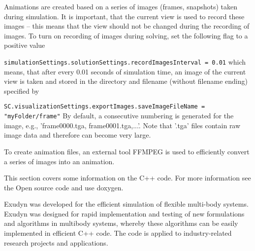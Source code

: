 Animations are created based on a series of images (frames, snapshots) taken during simulation. It is important, that the current view is used to record these images -- this means that the view should not be changed during the recording of images.
To turn on recording of images during solving, set the following flag to a positive value
\bi
  \item \texttt{simulationSettings.solutionSettings.recordImagesInterval = 0.01}
\ei
which means, that after every 0.01 seconds of simulation time, an image of the current view is taken and stored in the directory and filename (without filename ending) specified by 
\bi
  \item \texttt{SC.visualizationSettings.exportImages.saveImageFileName = "myFolder/frame"}
\ei
By default, a consecutive numbering is generated for the image, e.g., 'frame0000.tga, frame0001.tga,...'. Note that '.tga' files contain raw image data and therefore can become very large.

To create animation files, an external tool FFMPEG is used to efficiently convert a series of images into an animation.


This section covers some information on the C++ code. For more information see the Open source code and use doxygen.

Exudyn was developed for the efficient simulation of flexible multi-body systems. Exudyn was designed for rapid implementation and testing of new formulations and algorithms in multibody systems, whereby these algorithms can be easily implemented in efficient C++ code. The code is applied to industry-related research projects and applications.

